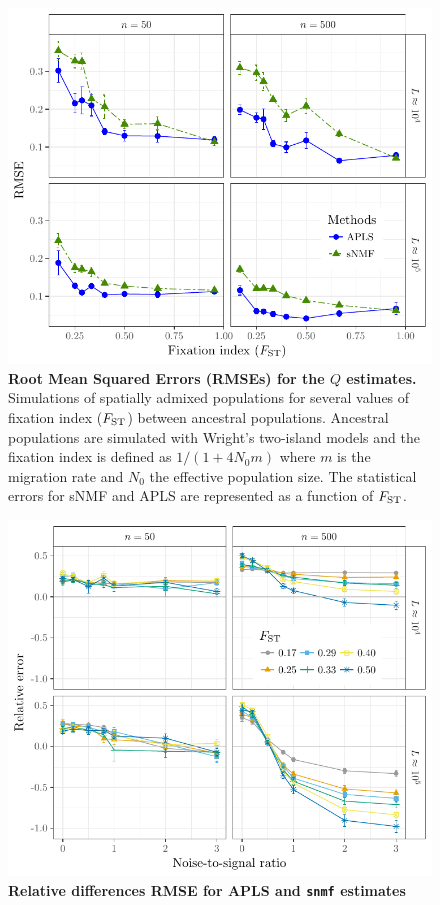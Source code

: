 \begin{figure}
  \centering
  \includegraphics{./Figures/figure2.pdf}
  \caption{{\bf Root Mean Squared Errors (RMSEs) for the $Q$ estimates.}
    Simulations of spatially admixed populations for several values of fixation
    index ($F_{\rm ST}$) between ancestral populations. Ancestral populations
    are simulated with Wright's two-island models and the fixation index is
    defined as $1 / (1 + 4 N_0 m)$ where $m$ is the migration rate and $N_0$ the
    effective population size. The statistical errors for sNMF and APLS are
    represented as a function of $F_{\rm ST}$. }
  \label{fig:fig2}
\end{figure}  

\clearpage 
\newpage

\begin{figure}
  \centering
  \includegraphics{./Figures/figure2_5.pdf}
  \caption{{\bf Relative differences RMSE for APLS and {\tt snmf} estimates}}
  \label{fig:fig2_5}
\end{figure}  

